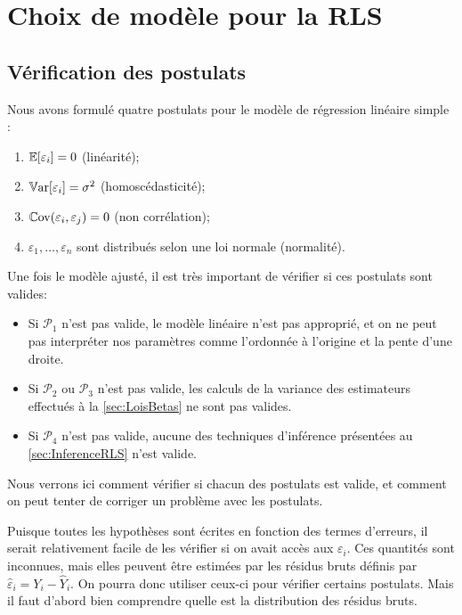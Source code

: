 \chapter{Choix de modèle pour la RLS}
\label{sec:ChoixModeleRLS}


\section{Vérification des postulats}
\label{sec:VérificationDesPostulats}
Nous avons formulé quatre postulats pour le modèle de régression linéaire simple :
\begin{center}
\begin{enumerate}
\item[$\mathcal{P}_1.$] $\mathbb{E}[\varepsilon_i]=0$ (lin\'earit\'e);
\item[$\mathcal{P}_2.$] $\mathbb{V}\text{ar}[\varepsilon_i]=\sigma^2$ (homosc\'edasticit\'e);
\item[$\mathcal{P}_3.$] $\mathbb{C}\text{ov}(\varepsilon_i,\varepsilon_j)=0$ (non corr\'elation);
\item[$\mathcal{P}_4.$] $\varepsilon_1,\ldots,\varepsilon_n$ sont distribués selon une loi normale (normalit\'e).
\end{enumerate}
\end{center}

Une fois le modèle ajusté, il est très important de vérifier si ces postulats sont valides:
\begin{itemize}
\item[$\bullet$] Si $\mathcal{P}_1$ n'est pas valide, le modèle linéaire n'est pas approprié, et on ne peut pas interpréter nos paramètres comme l'ordonnée à l'origine et la pente d'une droite.
\item[$\bullet$] Si $\mathcal{P}_2$ ou $\mathcal{P}_3$ n'est pas valide, les calculs de la variance des estimateurs effectués à la \autoref{sec:LoisBetas} ne sont pas valides.
\item[$\bullet$] Si $\mathcal{P}_4$ n'est pas valide, aucune des techniques d'inférence présentées au \autoref{sec:InferenceRLS} n'est valide.
\end{itemize}

Nous verrons ici comment vérifier si chacun des postulats est valide, et comment on peut tenter de corriger un problème avec les postulats.

Puisque toutes les hypothèses sont écrites en fonction des termes d'erreurs, il serait relativement facile de les vérifier si on avait accès aux $\varepsilon_i$. Ces quantités sont inconnues, mais elles peuvent être estimées par les résidus bruts définis par $\hat{\varepsilon}_i=Y_i-\hat Y_i$. On pourra donc utiliser ceux-ci pour vérifier certains postulats. Mais il faut d'abord bien comprendre quelle est la distribution des résidus bruts.

